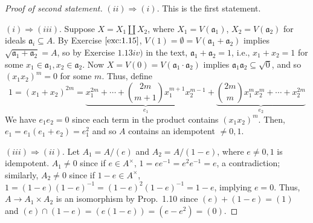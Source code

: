 \documentclass[12pt,letterpaper]{article}
\theoremstyle{definition}
\theoremstyle{remark}
\numberwithin{figure}{problem}
\numberwithin{equation}{section}
\begin{document}
\begin{proof}[Proof of second statement]
  $(ii) \Rightarrow
  (i)$.
  This is the first statement.
  \par
  $(i) \Rightarrow
  (iii)$.
  Suppose
  $X = X_1 \amalg
  X_2$, where
  $X_1 =
  V(\mathfrak{a}_1)$,
  $X_2 =
  V(\mathfrak{a}_2)$ for ideals
  $\mathfrak{a}_i \subseteq
  A$.
  By Exercise
  $\ref{exc:1.15}$,
  $V(1) = \emptyset = V(\mathfrak{a}_1 +
  \mathfrak{a}_2)$ implies
  $\sqrt{\mathfrak{a}_1 + \mathfrak{a}_2} =
  A$, so by Exercise
  $1.13iv)$ in the text,
  $\mathfrak{a}_1 + \mathfrak{a}_2 =
  1$, i.e.,
  $x_1 + x_2 =
  1$ for some
  $x_1 \in
  \mathfrak{a}_1,x_2\in\mathfrak{a}_2$.
  Now
  $X = V(0) =
  V(\mathfrak{a}_1\cdot\mathfrak{a}_2)$ implies
  $\mathfrak{a}_1\mathfrak{a}_2 \subseteq
  \sqrt{0}$, and so
  $(x_1x_2)^m =
  0$ for some
  $m$.
  Thus, define
  \begin{equation*}
    1 = (x_1 + x_2)^{2m} = \underbrace{x_1^{2m} + \cdots + \binom{2m}{m+1} x_1^{m+1}x_2^{m-1}}_{e_1} + \underbrace{\binom{2m}{m}x_1^mx_2^m + \cdots + x_2^{2m}}_{e_2}
  \end{equation*}
  We have
  $e_1e_2 =
  0$ since each term in the product contains
  $(x_1x_2)^m$.
  Then,
  $e_1 = e_1(e_1 + e_2) =
  e_1^2$ and so
  $A$ contains an idempotent
  $\ne
  0,1$.
  \par
  $(iii) \Rightarrow
  (ii)$.
  Let
  $A_1 =
  A/(e)$ and
  $A_2 =
  A/(1-e)$, where
  $e
  \ne0,1$ is idempotent.
  $A_1 \ne
  0$ since if
  $e \in
  A^\times$,
  $1 = ee^{-1} = e^2e^{-1} =
  e$, a contradiction; similarly,
  $A_2 \ne
  0$ since if
  $1-e \in
  A^\times$,
  $1 = (1-e)(1-e)^{-1} = (1-e)^2(1-e)^{-1} =
  1-e$, implying
  $e=0$.
  Thus,
  $A \to A_1 \times
  A_2$ is an isomorphism by Prop.~1.10 since
  $(e) + (1-e) =
  (1)$ and
  $(e) \cap (1-e) = (e(1-e)) = (e-e^2) =
  (0)$.
\end{proof}
\end{document}
